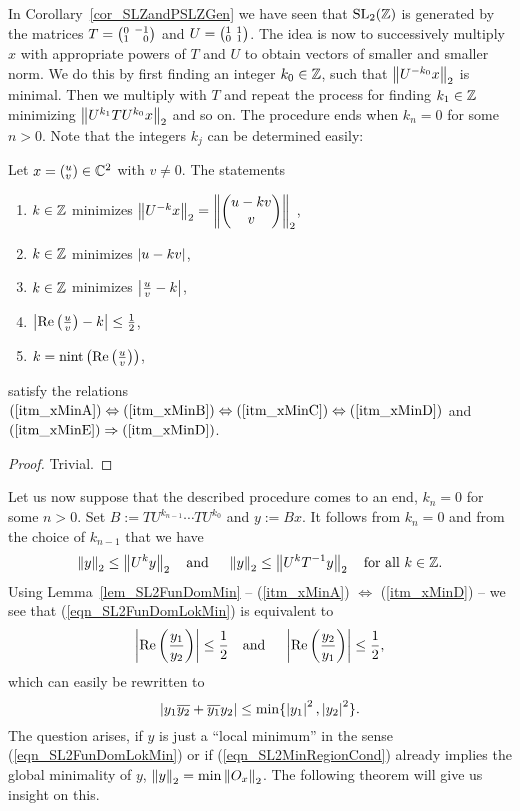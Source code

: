 In Corollary~\ref{cor_SLZandPSLZGen} we have seen that $\SL{\Z}$ is generated by the matrices $T = \smallmat{0}{-1}{1}{\phantom{-}0}$ and $U = \smallmat{1}{1}{0}{1}$. The idea is now to successively multiply $x$ with appropriate powers of $T$ and $U$ to obtain vectors of smaller and smaller norm. We do this by first finding an integer $k_0 \in \Z$, such that $\eucnorm{U^{-k_0}x}$ is minimal. Then we multiply with $T$ and repeat the process for finding $k_1 \in \Z$ minimizing $\eucnorm{U^{k_1} T U^{k_0} x}$ and so on. The procedure ends when $k_n = 0$ for some $n>0$. Note that the integers $k_j$ can be determined easily:
\begin{lemma}
\label{lem_SL2FunDomMin}
Let $x = ({}^u_v)\in \C^2$ with $v \ne 0$. The statements
\begin{enumerate}[\qquad(i)]
\item \label{itm_xMinA}
$k \in \Z$ minimizes $\eucnorm{U^{-k}x} = \eucnorm{\cvec{u - k v}{v}}$,
\item \label{itm_xMinB} $k \in \Z$ minimizes $\abs{u - k v}$,
\item \label{itm_xMinC} $k \in \Z$ minimizes $\abs{\frac{u}{v} - k}$,
\item \label{itm_xMinD} $\abs{\Re{\frac{u}{v}} - k} \le \reci{2}$,
\item \label{itm_xMinE} $k = \nint{\Re{\frac{u}{v}}}$,
\end{enumerate}
satisfy the relations $(\ref{itm_xMinA}) \Leftrightarrow (\ref{itm_xMinB}) \Leftrightarrow (\ref{itm_xMinC}) \Leftrightarrow (\ref{itm_xMinD})$ and $(\ref{itm_xMinE}) \Rightarrow (\ref{itm_xMinD})$.
\end{lemma}
\begin{proof}
Trivial.
\end{proof}
Let us now suppose that the described procedure comes to an end, \ie $k_n = 0$ for some $n > 0$. Set $B  := TU^{k_{n-1}} \cdots TU^{k_0}$ and $y :=  Bx$. It follows from $k_n = 0$ and from the choice of $k_{n-1}$ that we have 
\begin{equation}
\label{eqn_SL2FunDomLokMin}
\eucnorm{y} \le \eucnorm{U^k y} \text{\quad and \quad} \eucnorm{y} \le \eucnorm{U^k \inv{T} y} \text{\quad for all } k \in \Z.
\end{equation}
Using Lemma~\ref{lem_SL2FunDomMin} -- (\ref{itm_xMinA}) $\Leftrightarrow$ (\ref{itm_xMinD}) -- we see that (\ref{eqn_SL2FunDomLokMin}) is equivalent to
\begin{equation*}
\abs{\Re{\frac{y_1}{y_2}}} \le \reci{2} \text{\quad and \quad} \abs{\Re{\frac{y_2}{y_1}}} \le \reci{2},
\end{equation*}
which can easily be rewritten to
\begin{equation}
\label{eqn_SL2MinRegionCond}
\abs{y_1 \conj{y_2} + \conj{y_1} y_2} \le \min\{\abs{y_1}^2, \abs{y_2}^2\}.
\end{equation}
The question arises, if $y$ is just a ``local minimum'' in the sense (\ref{eqn_SL2FunDomLokMin}) or if (\ref{eqn_SL2MinRegionCond}) already implies the global minimality of $y$, \ie $\eucnorm{y} = \min \eucnorm{O_x}$. The following theorem will give us insight on this.

